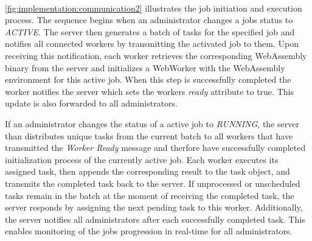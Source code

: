 ~\\
\autoref{fig:implementation:communication2} illustrates the job initiation and execution process. The sequence begins when an administrator changes a jobs status to \emph{ACTIVE}. The server then generates a batch of tasks for the specified job and notifies all connected workers by transmitting the activated job to them. Upon receiving this notification, each worker retrieves the corresponding WebAssembly binary from the server and initializes a WebWorker with the WebAssembly environment for this active job. When this step is successfully completed the worker notifies the server which sets the workers \emph{ready} attribute to true. This update is also forwarded to all administrators.

If an administrator changes the status of a active job to \emph{RUNNING}, the server than distributes unique tasks from the current batch to all workers that have transmitted the \emph{Worker Ready} message and therfore have successfully completed initialization process of the currently active job. Each worker executes its assigned task, then appends the corresponding result to the task object, and transmits the completed task back to the server. If unprocessed or unscheduled tasks remain in the batch at the moment of receiving the completed task, the server responds by assigning the next pending task to this worker. Additionally, the server notifies all administrators after each successfully completed task. This enables monitoring of the jobs progression in real-time for all administrators.

